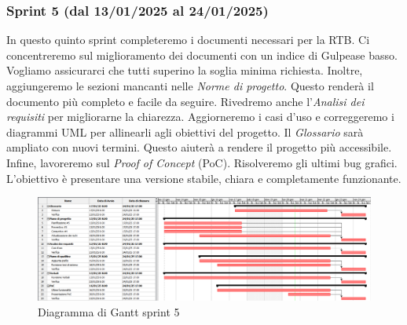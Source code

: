         \subsubsection{Sprint 5 (dal 13/01/2025 al 24/01/2025)}
        In questo quinto sprint completeremo i documenti necessari per la RTB.
        Ci concentreremo sul miglioramento dei documenti con un indice di Gulpease basso. Vogliamo assicurarci che tutti superino la soglia minima richiesta.
        Inoltre, aggiungeremo le sezioni mancanti nelle \textit{Norme di progetto}. Questo renderà il documento più completo e facile da seguire.
        Rivedremo anche l'\textit{Analisi dei requisiti} per migliorarne la chiarezza. Aggiorneremo i casi d'uso e correggeremo i diagrammi UML per allinearli agli obiettivi del progetto.
        Il \textit{Glossario} sarà ampliato con nuovi termini. Questo aiuterà a rendere il progetto più accessibile.
        Infine, lavoreremo sul \textit{Proof of Concept} (PoC). Risolveremo gli ultimi bug grafici. L'obiettivo è presentare una versione stabile, chiara e completamente funzionante.
                
        \begin{figure}[h!]
            \centering
            \includegraphics[scale = 0.4]{template/images/gantt5.png}
            \caption{Diagramma di Gantt sprint 5}
            \label{fig:3.4} %
        \end{figure}

 
